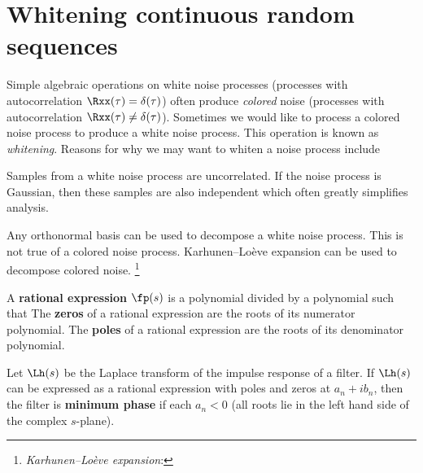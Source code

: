 \section{Whitening continuous random sequences}
\label{sec:whiten}
Simple algebraic operations on white noise processes
(processes with autocorrelation $\Rxx(\tau)=\delta(\tau)$)
often produce {\em colored} noise
(processes with autocorrelation $\Rxx(\tau)\ne\delta(\tau)$).
Sometimes we would like to process a colored noise process
to produce a white noise process.
This operation is known as {\em whitening}.
Reasons for why we may want to whiten a noise process include
\begin{enume}
   \item Samples from a white noise process are uncorrelated.
         If the noise process is Gaussian, then these samples
         are also independent which often greatly simplifies analysis.
   \item Any orthonormal basis can be used to decompose a white noise process.
         This is not true of a colored noise process.
         Karhunen--Lo\`eve expansion can be used to decompose colored noise.
         \footnote{{\em Karhunen--Lo\`eve expansion}: }
\end{enume}

\begin{definition}
A \textbf{rational expression} $\fp(s)$ is a polynomial divided by a polynomial
such that
The \textbf{zeros} of a rational expression are the roots of its numerator polynomial.
The \textbf{poles} of a rational expression are the roots of its denominator polynomial.
\end{definition}

\begin{definition}
Let $\Lh(s)$ be the Laplace transform of the impulse response of a filter.
If $\Lh(s)$ can be expressed as a rational expression with poles and zeros at
$a_n + ib_n$,
then the filter is \textbf{minimum phase} if each $a_n<0$
(all roots lie in the left hand side of the complex $s$-plane).
\end{definition}

